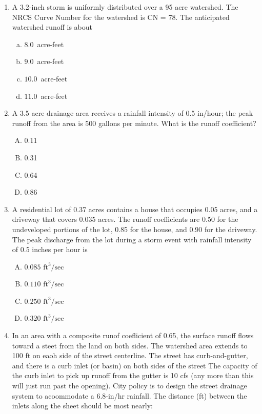 \documentclass[12pt]{article}
\begin{document}
\begin{enumerate}
\item A 3.2-inch storm is uniformly distributed over a 95 acre watershed. The NRCS Curve Number for the watershed is CN = 78. The anticipated watershed runoff is about

\begin{enumerate}[a)]
\item $8.0$~acre-feet
\item $9.0$~acre-feet
\item $10.0$~acre-feet%
\item $11.0$~acre-feet
\end{enumerate}
\clearpage

\item A 3.5 acre drainage area receives a rainfall intensity of 0.5 in/hour; the peak runoff from the area is 500 gallons per minute. What is the runoff coefficient?
\begin{enumerate} [(A)]
\item 0.11
\item 0.31
\item 0.64 %
\item 0.86
\end{enumerate}
\clearpage

\item A residential lot of 0.37 acres contains a house that occupies 0.05 acres, and a driveway that covers 0.035 acres. The runoff coefficients are 0.50 for the undeveloped portions of the lot, 0.85 for the house, and 0.90 for the driveway. The peak discharge from the lot during a storm event with rainfall intensity of 0.5 inches per hour is 
\begin{enumerate}[(A)]
\item $0.085$ $\text{ft}^3/\text{sec}$
\item $0.110$ $\text{ft}^3/\text{sec}$
\item $0.250$ $\text{ft}^3/\text{sec}$
\item $0.320$ $\text{ft}^3/\text{sec}$
\end{enumerate}
\clearpage

\item In an area with a composite runof coeflicient of 0.65, the surface runoff flows toward a steet from the land on both sides. The watershed area extends to 100 ft on eaoh side of the street centerline. The street has curb-and-gutter, and there is a curb inlet (or basin) on both sides of the street The capacity of the curb inlet to pick up runoff from the gutter is 10 cfs (any more than this will just run past the opening). City policy is to design the street drainage system to acoommodate a 6.8-in/hr rainfall. The distance (ft) between the inlets along the sheet should be most nearly:


\end{enumerate}
\end{document}
